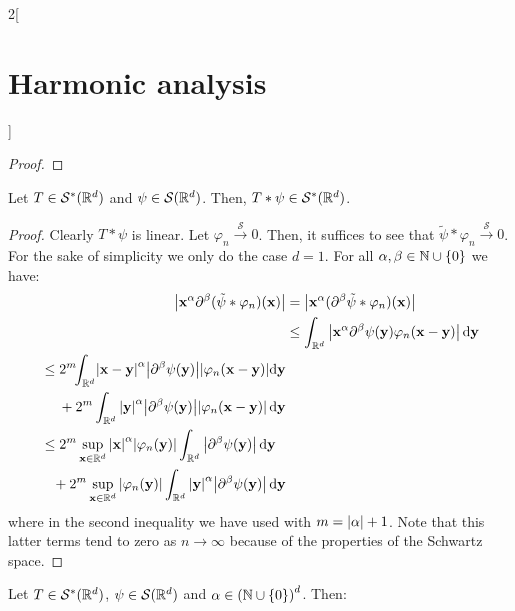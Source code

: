 \documentclass[../../../main_math.tex]{subfiles}
\begin{document}
\begin{multicols}{2}[\section{Harmonic analysis}]
\begin{proof}
  \end{proof}
  \begin{lemma}
    Let $T\in \mathcal{S}^*(\mathbb{R}^d)$ and $\psi\in \mathcal{S}(\mathbb{R}^d)$. Then, $T*\psi\in \mathcal{S}^*(\mathbb{R}^d)$.
  \end{lemma}
  \begin{proof}
    Clearly $T*\psi$ is linear. Let $\varphi_n\overset{\mathcal{S}}{\longrightarrow}0$. Then, it suffices to see that $\tilde\psi*\varphi_n\overset{\mathcal{S}}{\longrightarrow}0$. For the sake of simplicity we only do the case $d=1$. For all $\alpha,\beta\in{\ensuremath{\mathbb{N}}\cup\{0\}}$ we have:
    \begin{align*}
      \abs{\boldsymbol{\mathrm{x}}^\alpha \partial^\beta(\tilde\psi*\varphi_n)(\boldsymbol{\mathrm{x}})} & =\abs{\boldsymbol{\mathrm{x}}^\alpha (\partial^\beta\tilde\psi*\varphi_n)(\boldsymbol{\mathrm{x}})}                                                                 \\
                                                                       & \leq \int_{\mathbb{R}^d} \abs{\boldsymbol{\mathrm{x}}^\alpha \partial^\beta\psi(\boldsymbol{\mathrm{y}})\varphi_n(\boldsymbol{\mathrm{x}}-\boldsymbol{\mathrm{y}})}\dd{\boldsymbol{\mathrm{y}}}                               \\
      \begin{split}
        & \leq 2^m\!\!\int_{\mathbb{R}^d}\!\abs{\boldsymbol{\mathrm{x}}-\boldsymbol{\mathrm{y}}}^\alpha \abs{\partial^\beta\psi(\boldsymbol{\mathrm{y}})}\abs{\varphi_n(\boldsymbol{\mathrm{x}}-\boldsymbol{\mathrm{y}})}\!\dd{\boldsymbol{\mathrm{y}}} \\
        &\quad\;+2^m\int_{\mathbb{R}^d} \abs{\boldsymbol{\mathrm{y}}}^\alpha\abs{\partial^\beta\psi(\boldsymbol{\mathrm{y}})} \abs{\varphi_n(\boldsymbol{\mathrm{x}}-\boldsymbol{\mathrm{y}})}\dd{\boldsymbol{\mathrm{y}}} \\
      \end{split} \\
      \begin{split}
        & \leq 2^m\sup_{\boldsymbol{\mathrm{x}}\in\mathbb{R}^d}\abs{\boldsymbol{\mathrm{x}}}^\alpha\abs{\varphi_n(\boldsymbol{\mathrm{y}})}\int_{\mathbb{R}^d}  \abs{\partial^\beta\psi(\boldsymbol{\mathrm{y}})}\dd{\boldsymbol{\mathrm{y}}} \\
        &\;\;\;+2^m\sup_{\boldsymbol{\mathrm{x}}\in\mathbb{R}^d}\abs{\varphi_n(\boldsymbol{\mathrm{y}})}\int_{\mathbb{R}^d} \abs{\boldsymbol{\mathrm{y}}}^\alpha\abs{\partial^\beta\psi(\boldsymbol{\mathrm{y}})}\dd{\boldsymbol{\mathrm{y}}} \\
      \end{split}
    \end{align*}
    where in the second inequality we have used  with $m=\abs{\alpha}+1$. Note that this latter terms tend to zero as $n\to\infty$ because of the properties of the Schwartz space.
  \end{proof}
  \begin{lemma}
    Let $T\in \mathcal{S}^*(\mathbb{R}^d)$, $\psi\in \mathcal{S}(\mathbb{R}^d)$ and $\alpha\in{(\ensuremath{\mathbb{N}}\cup\{0\})}^d$. Then:

\end{lemma}
\end{multicols}
\end{document}
